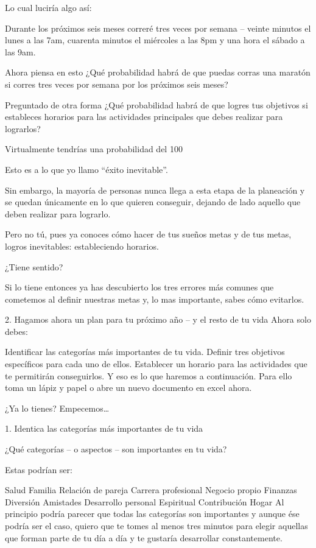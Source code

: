 \documentclass[12pt]{book}
\begin{document}
Lo cual luciría algo así:

Durante los próximos seis meses correré tres veces por semana – veinte minutos el lunes a las 7am, cuarenta minutos el miércoles a las 8pm y una hora el sábado a las 9am.

Ahora piensa en esto ¿Qué probabilidad habrá de que puedas corras una maratón si corres tres veces por semana por los próximos seis meses?

Preguntado de otra forma ¿Qué probabilidad habrá de que logres tus objetivos si estableces horarios para las actividades principales que debes realizar para lograrlos?

Virtualmente tendrías una probabilidad del 100%

Esto es a lo que yo llamo “éxito inevitable”.

Sin embargo, la mayoría de personas nunca llega a esta etapa de la planeación y se quedan únicamente en lo que quieren conseguir, dejando de lado aquello que deben realizar para lograrlo.

Pero no tú, pues ya conoces cómo hacer de tus sueños metas y de tus metas, logros inevitables: estableciendo horarios.

¿Tiene sentido?

Si lo tiene entonces ya has descubierto los tres errores más comunes que cometemos al definir nuestras metas y, lo mas importante, sabes cómo evitarlos.

2. Hagamos ahora un plan para tu próximo año – y el resto de tu vida
Ahora solo debes:

Identificar las categorías más importantes de tu vida.
Definir tres objetivos específicos para cada uno de ellos.
Establecer un horario para las actividades que te permitirán conseguirlos.
Y eso es lo que haremos a continuación. Para ello toma un lápiz y papel o abre un nuevo documento en excel ahora.

¿Ya lo tienes? Empecemos…

1. Identica las categorías más importantes de tu vida

¿Qué categorías – o aspectos – son importantes en tu vida?

Estas podrían ser:

Salud
Familia
Relación de pareja
Carrera profesional
Negocio propio
Finanzas
Diversión
Amistades
Desarrollo personal
Espiritual
Contribución
Hogar
Al principio podría parecer que todas las categorías son importantes y aunque ése podría ser el caso, quiero que te tomes al menos tres minutos para elegir aquellas que forman parte de tu día a día y te gustaría desarrollar constantemente.
\end{document}
